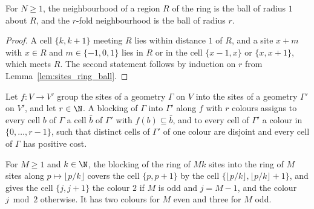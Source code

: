 \begin{lemma}
    \label{lem:circuits_ring_neighbourhood}
    \leanok
    For $N\ge1$, the neighbourhood of a region $R$ of the ring is the ball of radius $1$
    about $R$, and the $r$-fold neighbourhood is the ball of radius $r$.
\end{lemma}
\begin{proof}\leanok
    A cell $\{k,k+1\}$ meeting $R$ lies within distance $1$ of $R$, and a site $x+m$ with
    $x\in R$ and $m\in\{-1,0,1\}$ lies in $R$ or in the cell $\{x-1,x\}$ or $\{x,x+1\}$,
    which meets $R$. The second statement follows by induction on $r$ from
    Lemma~\ref{lem:sites_ring_ball}.
\end{proof}

\begin{definition}
    \label{def:circuits_blocking}
    \leanok
    Let $f:V\to V'$ group the sites of a geometry $\Gamma$ on $V$ into the sites of a
    geometry $\Gamma'$ on $V'$, and let $r\in\N$. A blocking of $\Gamma$ into $\Gamma'$ along
    $f$ with $r$ colours assigns to every cell $b$ of $\Gamma$ a cell $\bar b$ of $\Gamma'$
    with $f(b)\subseteq\bar b$, and to every cell of $\Gamma'$ a colour in
    $\{0,\dots,r-1\}$, such that distinct cells of $\Gamma'$ of one colour are disjoint and
    every cell of $\Gamma$ has positive cost.
\end{definition}

\begin{definition}
    \label{def:circuits_ring_blocking}
    \leanok
    For $M\ge1$ and $k\in\N$, the blocking of the ring of $Mk$ sites into the ring of $M$
    sites along $p\mapsto\lfloor p/k\rfloor$ covers the cell $\{p,p+1\}$ by the cell
    $\{\lfloor p/k\rfloor,\lfloor p/k\rfloor+1\}$, and gives the cell $\{j,j+1\}$ the colour
    $2$ if $M$ is odd and $j=M-1$, and the colour $j\bmod2$ otherwise. It has two colours for
    $M$ even and three for $M$ odd.
\end{definition}

